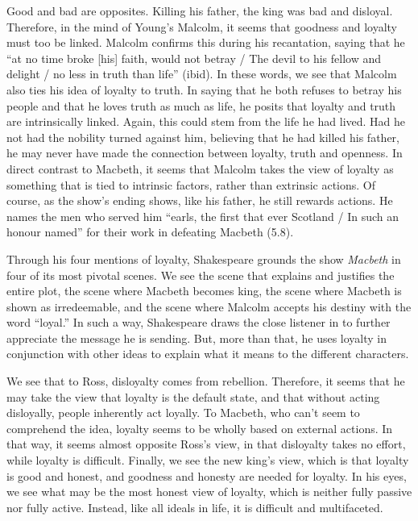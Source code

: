 \documentclass[12pt]{article}[titlepage]
\newcommand{\say}[1]{``#1''}
\newcommand{\1}{\={a}}
\newcommand{\2}{\={e}}
\newcommand{\3}{\={\i}}
\newcommand{\4}{\=o}
\newcommand{\5}{\=u}
\newcommand{\6}{\={A}}
\renewcommand{\,}{\textsuperscript{,}}
\begin{document}
Good and bad are opposites.
Killing his father, the king was bad and disloyal.
Therefore, in the mind of Young's Malcolm, it seems that goodness and loyalty must too be linked.
Malcolm confirms this during his recantation, saying that he \say{at no time broke [his] faith, would not betray / The devil to his fellow and delight / no less in truth than life} (ibid).
In these words, we see that Malcolm also ties his idea of loyalty to truth.
In saying that he both refuses to betray his people and that he loves truth as much as life, he posits that loyalty and truth are intrinsically linked.
Again, this could stem from the life he had lived.
Had he not had the nobility turned against him, believing that he had killed his father, he may never have made the connection between loyalty, truth and openness.
In direct contrast to Macbeth, it seems that Malcolm takes the view of loyalty as something that is tied to intrinsic factors, rather than extrinsic actions.
Of course, as the show's ending shows, like his father, he still rewards actions.
He names the men who served him \say{earls, the first that ever Scotland / In such an honour named} for their work in defeating Macbeth (5.8).

Through his four mentions of loyalty, Shakespeare grounds the show \textit{Macbeth} in four of its most pivotal scenes.
We see the scene that explains and justifies the entire plot, the scene where Macbeth becomes king, the scene where Macbeth is shown as irredeemable, and the scene where Malcolm accepts his destiny with the word \say{loyal.}
In such a way, Shakespeare draws the close listener in to further appreciate the message he is sending.
But, more than that, he uses loyalty in conjunction with other ideas to explain what it means to the different characters.

We see that to Ross, disloyalty comes from rebellion.
Therefore, it seems that he may take the view that loyalty is the default state, and that without acting disloyally, people inherently act loyally.
To Macbeth, who can't seem to comprehend the idea, loyalty seems to be wholly based on external actions.
In that way, it seems almost opposite Ross's view, in that disloyalty takes no effort, while loyalty is difficult.
Finally, we see the new king's view, which is that loyalty is good and honest, and goodness and honesty are needed for loyalty.
In his eyes, we see what may be the most honest view of loyalty, which is neither fully passive nor fully active.
Instead, like all ideals in life, it is difficult and multifaceted.
\end{document}
